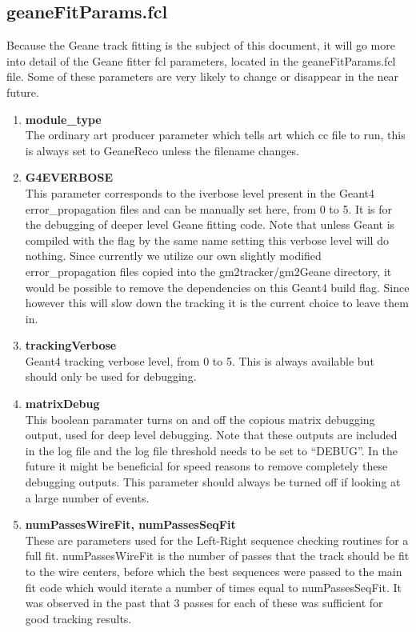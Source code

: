 \documentclass{article}
\begin{document}
  \subsection{geaneFitParams.fcl}

    Because the Geane track fitting is the subject of this document, it will go more into detail of the Geane fitter fcl parameters, located in the geaneFitParams.fcl file. Some of these parameters are very likely to change or disappear in the near future.

    \begin{enumerate}

      \item{\bf{module\_type}} \\
      The ordinary art producer parameter which tells art which cc file to run, this is always set to GeaneReco unless the filename changes.

      \item{\bf{G4EVERBOSE}} \\
      This parameter corresponds to the iverbose level present in the Geant4 error\_propagation files and can be manually set here, from 0 to 5. It is for the debugging of deeper level Geane fitting code. Note that unless Geant is compiled with the flag by the same name setting this verbose level will do nothing. Since currently we utilize our own slightly modified error\_propagation files copied into the gm2tracker/gm2Geane directory, it would be possible to remove the dependencies on this Geant4 build flag. Since however this will slow down the tracking it is the current choice to leave them in. 

      \item{\bf{trackingVerbose}} \\
      Geant4 tracking verbose level, from 0 to 5. This is always available but should only be used for debugging.

      \item{\bf{matrixDebug}} \\
      This boolean paramater turns on and off the copious matrix debugging output, used for deep level debugging. Note that these outputs are included in the log file and the log file threshold needs to be set to ``DEBUG''. In the future it might be beneficial for speed reasons to remove completely these debugging outputs. This parameter should always be turned off if looking at a large number of events.

      \item{\bf{numPassesWireFit, numPassesSeqFit}} \\
      These are parameters used for the Left-Right sequence checking routines for a full fit. numPassesWireFit is the number of passes that the track should be fit to the wire centers, before which the best sequences were passed to the main fit code which would iterate a number of times equal to numPassesSeqFit. It was observed in the past that 3 passes for each of these was sufficient for good tracking results. 


\end{enumerate}
\end{document}
